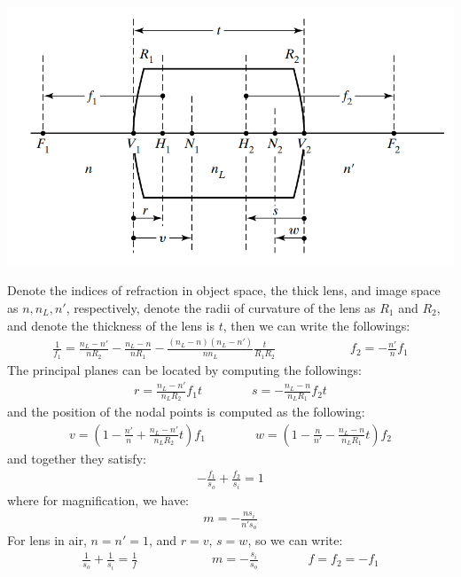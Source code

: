 \documentclass[11pt]{book}
\theoremstyle{break}
\theoremstyle{break}
\begin{document}
\begin{center}
\includegraphics[scale=0.5]{thickLens.png}
\end{center}
Denote the indices of refraction in object space, the thick lens, and image space as $n, n_L, n'$, respectively, denote the radii of curvature of the lens as $R_1$ and $R_2$, and denote the thickness of the lens is $t$, then we can write the followings:
\begin{align*}
\frac{1}{f_1} = \frac{n_L- n'}{n R_2} -\frac{n_L-n}{nR_1} - \frac{(n_L-n)(n_L - n')}{n n_L} \frac{t}{R_1R_2} \qquad\qquad\qquad
f_2 = -\frac{n'}{n}f_1
\end{align*}
The principal planes can be located by computing the followings:
\begin{align*}
r = \frac{n_L - n'}{n_L R_2} f_1 t \qquad\qquad s = -\frac{n_L-n}{n_LR_1}f_2 t
\end{align*}
and the position of the nodal points is computed as the following:
\begin{align*}
v = \left( 1- \frac{n'}{n}+ \frac{n_L-n'}{n_L R_2} t\right) f_1 \qquad\qquad w = \left( 1-\frac{n}{n'} - \frac{n_L - n}{n_L R_1} t\right) f_2
\end{align*}
and together they satisfy:
\begin{align*}
-\frac{f_1}{s_o} + \frac{f_2}{s_i} = 1
\end{align*}
where for magnification, we have:
\begin{align*}
m = -\frac{ns_i}{n's_o}
\end{align*}
For lens in air, $n=n'=1$, and $r=v$, $s=w$, so we can write:
\begin{align*}
\frac{1}{s_o} + \frac{1}{s_i} = \frac{1}{f} \qquad\qquad\qquad m = -\frac{s_i}{s_o}\qquad\qquad f=f_2 = -f_1
\end{align*}
\end{document}
